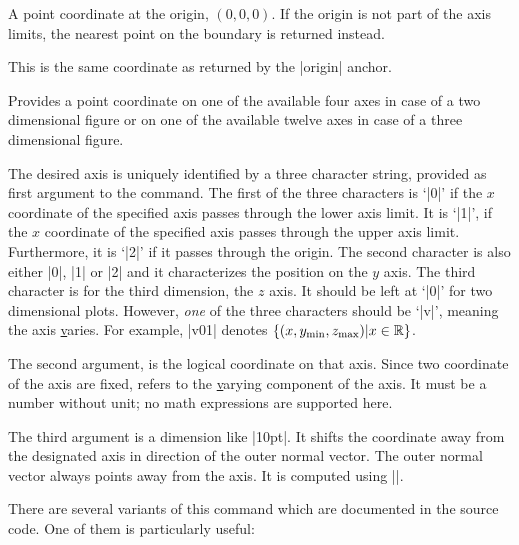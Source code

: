 \begin{commandlist}{\pgfplotspointaxisorigin}
	A point coordinate at the origin, $(0,0,0)$. If the origin is not part of the axis limits, the nearest point on the boundary is returned instead.

	This is the same coordinate as returned by the |origin| anchor.
\end{commandlist}

\begin{command}{\pgfplotsqpointoutsideofaxis{}}
	Provides a point coordinate on one of the available four axes in case of a two dimensional figure or on one of the available twelve axes in case of a three dimensional figure.
	
	The desired axis is uniquely identified by a three character string, provided as first argument to the command. The first of the three characters is `|0|' if the $x$ coordinate of the specified axis passes through the lower axis limit. It is `|1|', if the $x$ coordinate of the specified axis passes through the upper axis limit. Furthermore, it is `|2|' if it passes through the origin. The second character is also either |0|, |1| or |2| and it characterizes the position on the $y$ axis. The third character is for the third dimension, the $z$ axis. It should be left at `|0|' for two dimensional plots. However, \emph{one} of the three characters should be `|v|', meaning the axis \underline varies. For example, |v01| denotes $\{ (x,y_{\text{min}},z_{\text{max}}) \vert x \in \mathbb{R} \}$.
	
	The second argument,  is the logical coordinate on that axis. Since two coordinate of the axis are fixed,  refers to the \underline varying component of the axis. It must be a number without unit; no math expressions are supported here.

	The third argument  is a dimension like |10pt|. It shifts the coordinate away from the designated axis in direction of the outer normal vector. The outer normal vector always points away from the axis. It is computed using
	|\pgfplotspointouternormalvectorofaxis|.

	There are several variants of this command which are documented in the source code. One of them is particularly useful:
\end{command}

